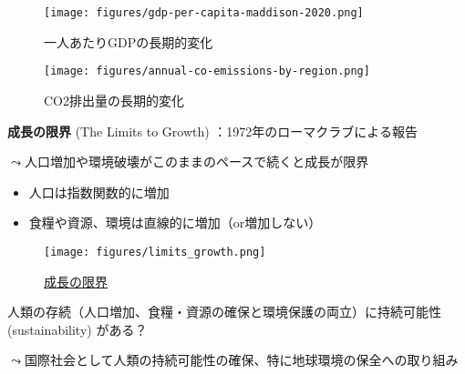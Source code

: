 \documentclass[
  xelatex,
  ja=standard]{bxjsarticle}
\providecommand{\tightlist}{%
  \setlength{\itemsep}{0pt}\setlength{\parskip}{0pt}}\usepackage{longtable,booktabs,array}
\begin{document}
\begin{figure}[htpb]

{\centering \texttt{[image: figures/gdp-per-capita-maddison-2020.png]}

}

\caption{一人あたりGDPの長期的変化}

\end{figure}

\begin{figure}[htpb]

{\centering \texttt{[image: figures/annual-co-emissions-by-region.png]}

}

\caption{CO2排出量の長期的変化}

\end{figure}

\textbf{成長の限界} (The Limits to Growth)
：1972年のローマクラブによる報告

\(\leadsto\)人口増加や環境破壊がこのままのペースで続くと成長が限界

\begin{itemize}
\tightlist
\item
  人口は指数関数的に増加
\item
  食糧や資源、環境は直線的に増加（or増加しない）
\end{itemize}

\begin{figure}[htpb]

{\centering \texttt{[image: figures/limits\_growth.png]}

}

\caption{\href{https://commons.wikimedia.org/wiki/File:Limits-to-growth-figure-35.svg}{成長の限界}}

\end{figure}

人類の存続（人口増加、食糧・資源の確保と環境保護の両立）に持続可能性
(sustainability) がある？

\(\leadsto\)国際社会として人類の持続可能性の確保、特に地球環境の保全への取り組み
\end{document}

